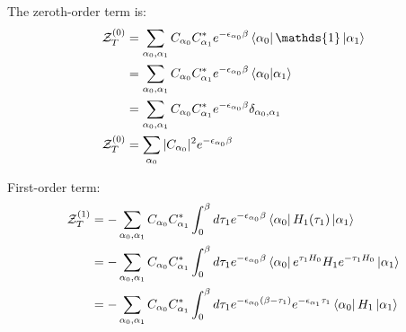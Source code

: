 \documentclass[12pt, two sided]{article}
\begin{document}
The zeroth-order term is:
\begin{equation}
\begin{aligned}
\mathcal{Z}_T^{(0)} &= \sum_{\alpha_0, \alpha_1} C_{\alpha_0} C_{\alpha_1}^{*} e^{-\epsilon_{\alpha_0} \beta}  \bra{\alpha_0} \mathds{1} \ket{\alpha_1} \\
&= \sum_{\alpha_0, \alpha_1} C_{\alpha_0} C_{\alpha_1}^{*} e^{-\epsilon_{\alpha_0} \beta}  \bra{\alpha_0} \ket{\alpha_1} \\
&= \sum_{\alpha_0, \alpha_1} C_{\alpha_0} C_{\alpha_1}^{*} e^{-\epsilon_{\alpha_0} \beta} \delta_{\alpha_0,\alpha_1} \\
\mathcal{Z}_T^{(0)}  &= \sum_{\alpha_0} \vert C_{\alpha_0} \vert^2 e^{-\epsilon_{\alpha_0} \beta}
\end{aligned}
\end{equation}

First-order term:
\begin{equation}
\begin{aligned}
\mathcal{Z}_T^{(1)} &= -\sum_{\alpha_0, \alpha_1} C_{\alpha_0} C_{\alpha_1}^{*}  \int_{0}^{\beta} d\tau_1 e^{-\epsilon_{\alpha_0} \beta} \bra{\alpha_0}  H_1(\tau_1) \ket{\alpha_1} \\
&= -\sum_{\alpha_0, \alpha_1} C_{\alpha_0} C_{\alpha_1}^{*}  \int_{0}^{\beta} d\tau_1 e^{-\epsilon_{\alpha_0} \beta} \bra{\alpha_0} e^{\tau_1 H_0}H_1e^{-\tau_1 H_0}  \ket{\alpha_1} \\
&= -\sum_{\alpha_0, \alpha_1} C_{\alpha_0} C_{\alpha_1}^{*}  \int_{0}^{\beta} d\tau_1 e^{-\epsilon_{\alpha_0}(\beta-\tau_1)} e^{-\epsilon_{\alpha_1} \tau_1}  \bra{\alpha_0} H_1 \ket{\alpha_1}
\end{aligned}
\end{equation}

\end{document}
